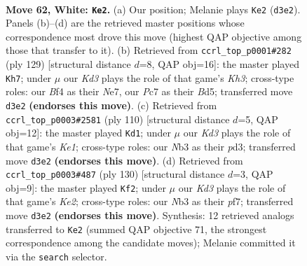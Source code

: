 \documentclass[11pt]{article}
\begin{document}
\clearpage

\begin{figure}[p]\centering
\begin{subfigure}{0.46\textwidth}\centering
\resizebox{\linewidth}{!}{%
\newchessgame
\chessboard[
  setfen={7k/2P5/2r5/8/5B2/1N1K4/8/8 w - - 37 62},
  showmover=false,
  pgfstyle=straightmove, color=movearrow, markmove={d3-e2}
]}
\caption{}
\end{subfigure}\hfill
\begin{subfigure}{0.46\textwidth}\centering
\resizebox{\linewidth}{!}{%
\newchessgame
\chessboard[
  setfen={8/4n3/7k/1R1b4/8/1p6/5K2/8 b - - 3 65},
  showmover=false,
  pgfstyle=straightmove, color=movearrow, markmove={h6-h7}
]}
\caption{}
\end{subfigure}
\\[4pt]
\begin{subfigure}{0.46\textwidth}\centering
\resizebox{\linewidth}{!}{%
\newchessgame
\chessboard[
  setfen={3B4/8/8/5k2/7P/3p4/7r/4K3 w - - 3 56},
  showmover=false,
  pgfstyle=straightmove, color=movearrow, markmove={e1-d1}
]}
\caption{}
\end{subfigure}\hfill
\begin{subfigure}{0.46\textwidth}\centering
\resizebox{\linewidth}{!}{%
\newchessgame
\chessboard[
  setfen={8/1P3p2/2B5/8/3k4/1r6/4K3/8 w - - 5 66},
  showmover=false,
  pgfstyle=straightmove, color=movearrow, markmove={e2-f2}
]}
\caption{}
\end{subfigure}
\caption{\textbf{Move 62, White: \texttt{Ke2}.} (a) Our position; Melanie plays \texttt{Ke2} (\texttt{d3e2}). Panels (b)--(d) are the retrieved master positions whose correspondence most drove this move (highest QAP objective among those that transfer to it). (b) Retrieved from \texttt{ccrl\_top\_p0001\#282} (ply 129) [structural distance $d$=8, QAP obj=16]: the master played \texttt{Kh7}; under $\mu$ our \emph{Kd3} plays the role of that game's \emph{Kh3}; cross-type roles: our \emph{B}f4 as their \emph{N}e7, our \emph{P}c7 as their \emph{B}d5; transferred move \texttt{d3e2} \textbf{(endorses this move)}. (c) Retrieved from \texttt{ccrl\_top\_p0003\#2581} (ply 110) [structural distance $d$=5, QAP obj=12]: the master played \texttt{Kd1}; under $\mu$ our \emph{Kd3} plays the role of that game's \emph{Ke1}; cross-type roles: our \emph{N}b3 as their \emph{p}d3; transferred move \texttt{d3e2} \textbf{(endorses this move)}. (d) Retrieved from \texttt{ccrl\_top\_p0003\#487} (ply 130) [structural distance $d$=3, QAP obj=9]: the master played \texttt{Kf2}; under $\mu$ our \emph{Kd3} plays the role of that game's \emph{Ke2}; cross-type roles: our \emph{N}b3 as their \emph{p}f7; transferred move \texttt{d3e2} \textbf{(endorses this move)}. Synthesis: 12 retrieved analogs transferred to \texttt{Ke2} (summed QAP objective 71, the strongest correspondence among the candidate moves); Melanie committed it via the \texttt{search} selector.}
\label{fig:thought-m122}
\end{figure}
\end{document}
